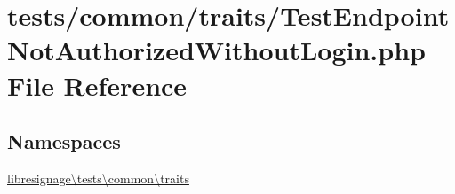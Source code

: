 \hypertarget{TestEndpointNotAuthorizedWithoutLogin_8php}{}\section{tests/common/traits/\+Test\+Endpoint\+Not\+Authorized\+Without\+Login.php File Reference}
\label{TestEndpointNotAuthorizedWithoutLogin_8php}
\subsection*{Namespaces}
\begin{DoxyCompactItemize}
\item 
 \hyperlink{namespacelibresignage_1_1tests_1_1common_1_1traits}{libresignage\textbackslash{}tests\textbackslash{}common\textbackslash{}traits}
\end{DoxyCompactItemize}
